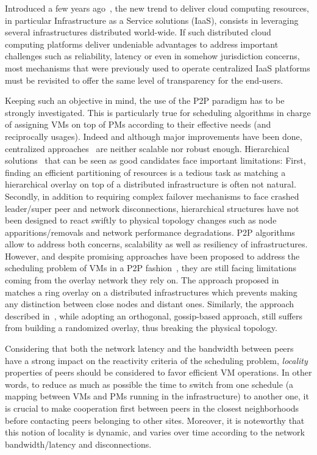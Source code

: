 Introduced a few years ago~\cite{greenberg:sigcomm09}, the new trend to deliver cloud
computing resources, in particular Infrastructure as a Service solutions (IaaS), consists
in leveraging several infrastructures distributed world-wide. If such distributed cloud
computing platforms deliver undeniable advantages to address important challenges such as
reliability, latency or even in somehow jurisdiction concerns, most mechanisms that were
previously used to operate centralized IaaS platforms must be revisited to offer the same
level of transparency for the end-users.

Keeping such an objective in mind, the use of the P2P paradigm has to be strongly
investigated. This is particularly true for scheduling algorithms in charge
of assigning VMs on top of PMs according to their effective needs (and reciprocally
usages). Indeed and although major improvements have been done, centralized
approaches~\cite{hermenier:2013} are neither scalable nor robust enough. Hierarchical
solutions~\cite{feller:ccgrid12} that can be seen as good candidates face important
limitations: First, finding an efficient partitioning of resources is a tedious task as
matching a hierarchical overlay on top of a distributed infrastructure is often not
natural. Secondly, in addition to requiring complex failover mechanisms to face
crashed leader/super peer and network disconnections, hierarchical structures have not
been designed to react swiftly to physical topology changes such as node
apparitions/removals and network performance degradations. P2P algorithms allow to
address both concerns, \ie scalability as well as resiliency of infrastructures. However,
and despite promising approaches have been proposed to address the scheduling problem of
VMs in a P2P fashion~\cite{quesnel:cpe2012,feller:cloudcom12}, they are still facing
limitations coming from the overlay network they rely on. The approach proposed
in~\cite{quesnel:cpe2012} matches a ring overlay on a distributed infrastructures which
prevents making any distinction between close nodes and distant ones. Similarly, the
approach described in~\cite{feller:cloudcom12}, while adopting an orthogonal, gossip-based approach,
still suffers from building a randomized overlay, thus breaking the physical topology.

Considering that both the network latency and the bandwidth between peers have a strong
impact on the reactivity criteria of the scheduling problem, \emph{locality} properties of
peers should be considered to favor efficient VM operations. In other words, to reduce as
much as possible the time to switch from one schedule (\ie a mapping between VMs and PMs
running in the infrastructure) to another one, it is crucial to make cooperation first
between peers in the closest neighborhoods before contacting peers belonging to other sites.
Moreover, it is noteworthy that this notion of locality is dynamic, and varies over time according
to the network bandwidth/latency and disconnections.

